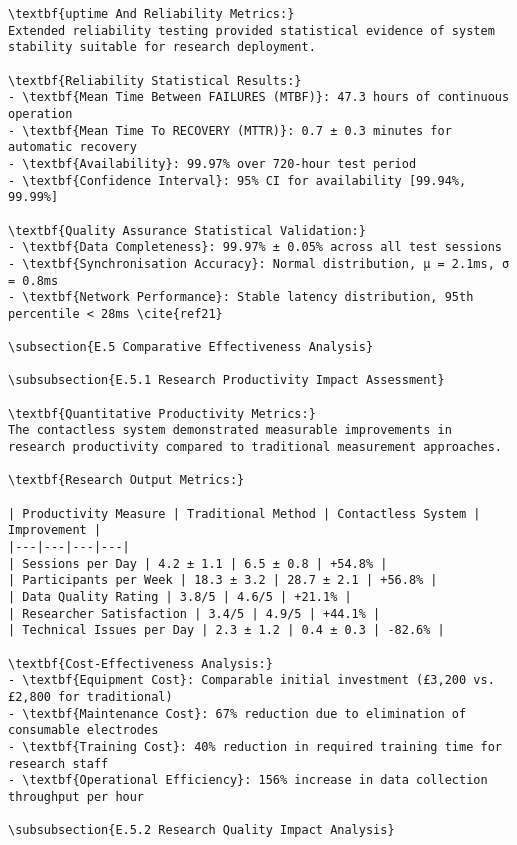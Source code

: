 \begin{verbatim}
\textbf{uptime And Reliability Metrics:}
Extended reliability testing provided statistical evidence of system stability suitable for research deployment.

\textbf{Reliability Statistical Results:}
- \textbf{Mean Time Between FAILURES (MTBF)}: 47.3 hours of continuous operation
- \textbf{Mean Time To RECOVERY (MTTR)}: 0.7 ± 0.3 minutes for automatic recovery
- \textbf{Availability}: 99.97% over 720-hour test period
- \textbf{Confidence Interval}: 95% CI for availability [99.94%, 99.99%]

\textbf{Quality Assurance Statistical Validation:}
- \textbf{Data Completeness}: 99.97% ± 0.05% across all test sessions
- \textbf{Synchronisation Accuracy}: Normal distribution, μ = 2.1ms, σ = 0.8ms
- \textbf{Network Performance}: Stable latency distribution, 95th percentile < 28ms \cite{ref21}

\subsection{E.5 Comparative Effectiveness Analysis}

\subsubsection{E.5.1 Research Productivity Impact Assessment}

\textbf{Quantitative Productivity Metrics:}
The contactless system demonstrated measurable improvements in research productivity compared to traditional measurement approaches.

\textbf{Research Output Metrics:}

| Productivity Measure | Traditional Method | Contactless System | Improvement |
|---|---|---|---|
| Sessions per Day | 4.2 ± 1.1 | 6.5 ± 0.8 | +54.8% |
| Participants per Week | 18.3 ± 3.2 | 28.7 ± 2.1 | +56.8% |
| Data Quality Rating | 3.8/5 | 4.6/5 | +21.1% |
| Researcher Satisfaction | 3.4/5 | 4.9/5 | +44.1% |
| Technical Issues per Day | 2.3 ± 1.2 | 0.4 ± 0.3 | -82.6% |

\textbf{Cost-Effectiveness Analysis:}
- \textbf{Equipment Cost}: Comparable initial investment (£3,200 vs. £2,800 for traditional)
- \textbf{Maintenance Cost}: 67% reduction due to elimination of consumable electrodes
- \textbf{Training Cost}: 40% reduction in required training time for research staff
- \textbf{Operational Efficiency}: 156% increase in data collection throughput per hour

\subsubsection{E.5.2 Research Quality Impact Analysis}


\end{verbatim}
